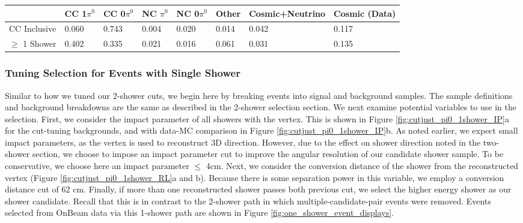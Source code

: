 \begin{table}[H]
\centering
{}
 \begin{tabular}{| l | l | l |l|l|l|l|l|}
 \hline
 & CC 1$\pi^0$ & CC 0$\pi^0$ & NC $\pi^0$ & NC 0$\pi^0$ & Other & Cosmic+Neutrino & Cosmic (Data) \\ [0.1ex] \hline
CC Inclusive & 0.060 & 0.743 & 0.004 & 0.020 & 0.014 & 0.042 & 0.117 \\
$\geq$ 1 Shower & 0.402 & 0.335 & 0.021 & 0.016 & 0.061 & 0.031 & 0.135\\ \hline
\end{tabular}
\end{table}

\subsubsection{Tuning Selection for Events with Single Shower}

Similar to how we tuned our 2-shower cuts, we begin here by breaking events into signal and background samples.  The sample definitions and background breakdowns are the same as described in the 2-shower selection section.  We next examine potential variables to use in the selection.  First, we consider the impact parameter of all showers with the vertex.  This is shown in Figure \ref{fig:cutjust_pi0_1shower_IP}a for the cut-tuning backgrounds, and with data-MC comparison in Figure \ref{fig:cutjust_pi0_1shower_IP}b. As noted earlier, we expect small impact parameters, as the vertex is used to reconstruct 3D direction. However, due to the effect on shower direction noted in the two-shower section, we choose to impose an impact parameter cut to improve the angular resolution of our candidate shower sample. To be conservative, we choose here an impact parameter $\leq$ 4cm. Next, we consider the conversion distance of the shower from the reconstructed vertex (Figure \ref{fig:cutjust_pi0_1shower_RL}a and b). Because there is some separation power in this variable, we employ a conversion distance cut of 62 cm.  Finally, if more than one reconstructed shower passes both previous cut, we select the higher energy shower as our shower candidate.  Recall that this is in contrast to the 2-shower path in which multiple-candidate-pair events were removed.  Events selected from OnBeam data via this 1-shower path are shown in Figure \ref{fig:one_shower_event_displays}. 

